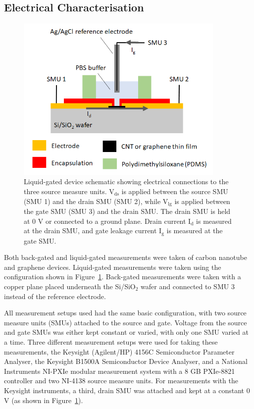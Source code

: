 \documentclass[
  letterpaper,
  DIV=11,
  numbers=noendperiod]{scrartcl}
\begin{document}
\hypertarget{sec-electrical-characterisation}{%
\subsection{Electrical
Characterisation}\label{sec-electrical-characterisation}}

\begin{figure}

{\centering \includegraphics[width=0.9\textwidth,height=\textheight]{figures/ch4/liquid-gate-schematic.png}

}

\caption{\label{fig-liquid-gate-schematic}Liquid-gated device schematic
showing electrical connections to the three source measure units.
V\(_{\mathrm{ds}}\) is applied between the source SMU (SMU 1) and the
drain SMU (SMU 2), while V\(_{\mathrm{lg}}\) is applied between the gate
SMU (SMU 3) and the drain SMU. The drain SMU is held at 0 V or connected
to a ground plane. Drain current I\(_{\mathrm{d}}\) is measured at the
drain SMU, and gate leakage current I\(_{\mathrm{g}}\) is measured at
the gate SMU.}

\end{figure}

Both back-gated and liquid-gated measurements were taken of carbon
nanotube and graphene devices. Liquid-gated measurements were taken
using the configuration shown in Figure~\ref{fig-liquid-gate-schematic}.
Back-gated measurements were taken with a copper plane placed underneath
the Si/SiO\(_2\) wafer and connected to SMU 3 instead of the reference
electrode.

All measurement setups used had the same basic configuration, with two
source measure units (SMUs) attached to the source and gate. Voltage
from the source and gate SMUs was either kept constant or varied, with
only one SMU varied at a time. Three different measurement setups were
used for taking these measurements, the Keysight (Agilent/HP) 4156C
Semiconductor Parameter Analyser, the Keysight B1500A Semiconductor
Device Analyser, and a National Instruments NI-PXIe modular measurement
system with a 8 GB PXIe-8821 controller and two NI-4138 source measure
units. For measurements with the Keysight instruments, a third, drain
SMU was attached and kept at a constant 0 V (as shown in
Figure~\ref{fig-liquid-gate-schematic}).
\end{document}
